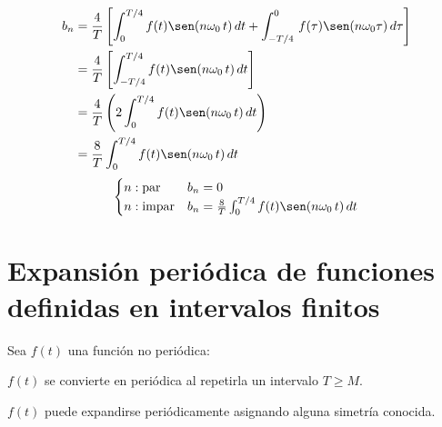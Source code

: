 \begin{equation*}
\begin{split}
    b_n
        &=\frac{4}{T}\left[
            \int_0^{T/4}f(t)\sen(n\omega_0\,t)\,dt+
            \int_{-T/4}^0\,f(\tau)\sen(n\omega_0\tau)\,d\tau
        \right]\\
        &=\frac{4}{T}\left[\int_{-T/4}^{T/4}f(t)\sen(n\omega_0\,t)\,dt\right]\\
        &=\frac{4}{T}\left(2\int_0^{T/4}f(t)\sen(n\omega_0\,t)\,dt\right)\\
        &=\frac{8}{T}\int_0^{T/4}f(t)\sen(n\omega_0\,t)\,dt\\
\end{split}
\end{equation*}
\begin{equation}
\begin{cases}
    n:\text{par}&b_n=0\\
    n:\text{impar}&b_n=\frac{8}{T}\int_0^{T/4}f(t)\sen(n\omega_0\,t)\,dt\\
\end{cases}
\end{equation}

\section{Expansión periódica de funciones definidas en intervalos finitos}
Sea $f(t)$ una función no periódica:
\begin{figure}[H]
    \centering
    
\end{figure}

$f(t)$ se convierte en periódica al repetirla un intervalo $T\geq M$.
\begin{figure}[H]
    \centering
    
\end{figure}

$f(t)$ puede expandirse periódicamente asignando alguna simetría conocida.

